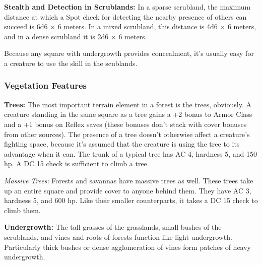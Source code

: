 
\textbf{Stealth and Detection in Scrublands:} In a sparse scrubland, the maximum distance at which a Spot check for detecting the nearby presence of others can succeed is 6d6 $\times$ 6 meters. In a mixed scrubland, this distance is 4d6 $\times$ 6 meters, and in a dense scrubland it is 2d6 $\times$ 6 meters.

Because any square with undergrowth provides concealment, it's usually easy for a creature to use the  skill in the scublands.


\subsubsection{Vegetation Features}
\textbf{Trees:} The most important terrain element in a forest is the trees, obviously. A creature standing in the same square as a tree gains a +2 bonus to Armor Class and a +1 bonus on Reflex saves (these bonuses don't stack with cover bonuses from other sources). The presence of a tree doesn't otherwise affect a creature's fighting space, because it's assumed that the creature is using the tree to its advantage when it can. The trunk of a typical tree has AC 4, hardness 5, and 150 hp. A DC 15  check is sufficient to climb a tree.

\textit{Massive Trees:} Forests and savannas have massive trees as well. These trees take up an entire square and provide cover to anyone behind them. They have AC 3, hardness 5, and 600 hp. Like their smaller counterparts, it takes a DC 15  check to climb them.


\textbf{Undergrowth:} The tall grasses of the grasslands, small bushes of the scrublands, and vines and roots of forests function like light undergrowth. Particularly thick bushes or dense agglomeration of vines form patches of heavy undergrowth.


